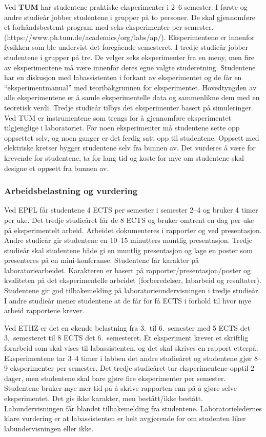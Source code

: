\documentclass{article}
\begin{document}
Ved \textbf{TUM} har studentene praktiske eksperimenter i 2--6 semester. I første og andre studieår jobber studentene i grupper på to personer. De skal gjennomføre et forhåndsbestemt program med seks eksperimenter per semester. (https://www.ph.tum.de/academics/org/labs/ap/). Eksperimentene er innenfor fysikken som ble undervist det foregående semesteret.
I tredje studieår jobber studentene i grupper på tre. De velger seks eksperimenter fra en meny, men fire av eksperimentene må være innenfor deres egne valgte studeretning. Studentene har en diskusjon med labassistenten i forkant av eksperimentet og de får en ``eksperimentmanual'' med teoribakgrunnen for eksperimentet. Hovedtyngden av alle eksperimentene er å samle eksperimentelle data og sammenlikne dem med en teoretisk verdi. Tredje studieår tilbys det eksperimenter basert på simuleringer.
Ved TUM er instrumentene som trengs for å gjennomføre eksperimentet tilgjenglige i laboratoriet. For noen eksperimenter må studentene sette opp oppsettet selv, og noen ganger er det ferdig satt opp til studentene. Oppsett med elektriske kretser bygger studentene selv fra bunnen av. Det vurderes å være for krevende for studentene, ta for lang tid og koste for mye om studentene skal designe et oppsett fra bunnen av.

\subsubsection{Arbeidsbelastning og vurdering}
Ved EPFL får studentene 4 ECTS per semester i semester 2--4 og bruker 4 timer per uke. Det tredje studieåret får de 8 ECTS og bruker omtrent en dag per uke på eksperimentelt arbeid. Arbeidet dokumenteres i rapporter og ved presentasjon. Andre studieår gir studentene en 10--15 minutters muntlig presentasjon. Tredje studieår skal studentene både gi en muntlig presentasjon og lage en poster som presenteres på en mini-konferanse. Studentene får karakter på laboratoriearbeidet. Karakteren er basert på rapporter/presentasjon/poster og kvaliteten på det eksperimentelle arbeidet (forberedelser, labarbeid og resultater).
Studentene gir god tilbakemelding på laboratorieundervisningen i tredje studieår. I andre studieår mener studentene at de får for få ECTS i forhold til hvor mye arbeid rapportene krever.

Ved ETHZ er det en økende belastning fra 3.~til 6.~semester med 5 ECTS det 3.~semesteret til 8 ECTS det 6.~semesteret. Et eksperiment krever et skriftlig forarbeid som skal vises til labassistenten, og det skal skrives en rapport etterpå. Eksperimentene tar 3--4 timer i labben det andre studieåret og studentene gjør 8--9 eksperimenter per semester. Det tredje studieåret tar eksperimentene opptil 2 dager, men studentene skal bare gjøre fire eksperimenter per semester. Studentene bruker mye mer tid på å skrive rapporten enn på å gjøre selve eksperimentet.
Det gis ikke karakter, men bestått/ikke bestått. Labundervisningen får blandet tilbakemelding fra studentene. Laboratorieledernes klare vurdering er at labassistenten er helt avgjørende for om studenten liker labundervisningen eller ikke.
\end{document}
